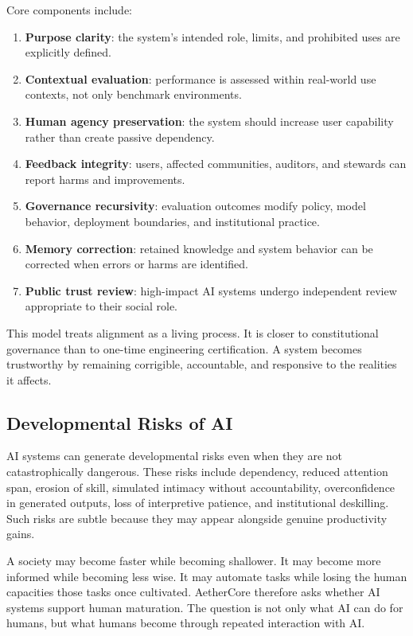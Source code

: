 \documentclass[12pt]{article}
\begin{document}
Core components include:

\begin{enumerate}
  \item \textbf{Purpose clarity}: the system's intended role, limits, and prohibited uses are explicitly defined.
  \item \textbf{Contextual evaluation}: performance is assessed within real-world use contexts, not only benchmark environments.
  \item \textbf{Human agency preservation}: the system should increase user capability rather than create passive dependency.
  \item \textbf{Feedback integrity}: users, affected communities, auditors, and stewards can report harms and improvements.
  \item \textbf{Governance recursivity}: evaluation outcomes modify policy, model behavior, deployment boundaries, and institutional practice.
  \item \textbf{Memory correction}: retained knowledge and system behavior can be corrected when errors or harms are identified.
  \item \textbf{Public trust review}: high-impact AI systems undergo independent review appropriate to their social role.
\end{enumerate}

This model treats alignment as a living process. It is closer to constitutional governance than to one-time engineering certification. A system becomes trustworthy by remaining corrigible, accountable, and responsive to the realities it affects.

\subsection{Developmental Risks of AI}

AI systems can generate developmental risks even when they are not catastrophically dangerous. These risks include dependency, reduced attention span, erosion of skill, simulated intimacy without accountability, overconfidence in generated outputs, loss of interpretive patience, and institutional deskilling. Such risks are subtle because they may appear alongside genuine productivity gains.

A society may become faster while becoming shallower. It may become more informed while becoming less wise. It may automate tasks while losing the human capacities those tasks once cultivated. AetherCore therefore asks whether AI systems support human maturation. The question is not only what AI can do for humans, but what humans become through repeated interaction with AI.
\end{document}

